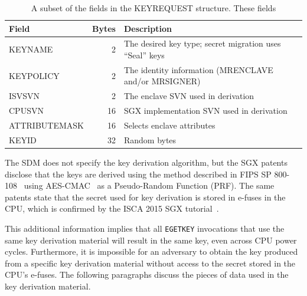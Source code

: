 
\begin{table}[hbt]
  \centering
  \begin{tabularx}{\columnwidth}{| l | r | X |}
  \hline
  \textbf{Field} & \textbf{Bytes} & \textbf{Description} \\
  \hline
  KEYNAME & 2 & The desired key type; secret migration uses ``Seal'' keys \\
  \hline
  KEYPOLICY & 2 & The identity information (MRENCLAVE and/or MRSIGNER) \\
  \hline
  ISVSVN & 2 & The enclave SVN used in derivation\\
  \hline
  CPUSVN & 16 & SGX implementation SVN used in derivation \\
  \hline
  ATTRIBUTEMASK & 16 & Selects enclave attributes \\
  \hline
  KEYID & 32 & Random bytes \\
  \hline
  \end{tabularx}
  \caption{
    A subset of the fields in the KEYREQUEST structure. These fields
  }
  \label{fig:sgx_keyrequest}
\end{table}


The SDM does not specify the key derivation algorithm, but the SGX
patents~\cite{intel2013patent1, intel2013patent2} disclose that the keys are
derived using the method described in FIPS SP 800-108~\cite{fips2009kdf} using
AES-CMAC~\cite{fips2005cmac} as a Pseudo-Random Function (PRF). The same
patents state that the secret used for key derivation is stored in e-fuses in
the CPU, which is confirmed by the ISCA 2015 SGX
tutorial~\cite{intel2015iscasgx}.

This additional information implies that all \texttt{EGETKEY} invocations that
use the same key derivation material will result in the same key, even across
CPU power cycles. Furthermore, it is impossible for an adversary to obtain the
key produced from a specific key derivation material without access to the
secret stored in the CPU's e-fuses. The following paragraphs discuss the pieces
of data used in the key derivation material.


